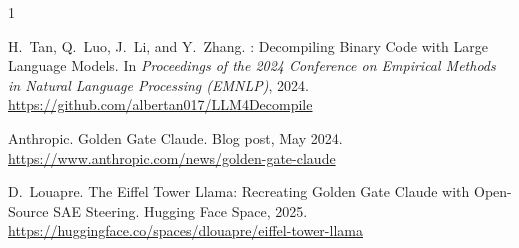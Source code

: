 \documentclass[11pt,letterpaper]{article}
\begin{document}

\begin{thebibliography}{1}

H.~Tan, Q.~Luo, J.~Li, and Y.~Zhang.
: Decompiling Binary Code with Large Language Models.
\newblock In \emph{Proceedings of the 2024 Conference on Empirical Methods in Natural Language Processing (EMNLP)}, 2024.
\newblock \url{https://github.com/albertan017/LLM4Decompile}

Anthropic.
\newblock Golden Gate Claude.
\newblock Blog post, May 2024.
\newblock \url{https://www.anthropic.com/news/golden-gate-claude}

D.~Louapre.
\newblock The Eiffel Tower Llama: Recreating Golden Gate Claude with Open-Source SAE Steering.
\newblock Hugging Face Space, 2025.
\newblock \url{https://huggingface.co/spaces/dlouapre/eiffel-tower-llama}

\end{thebibliography}
\end{document}
